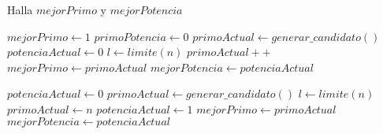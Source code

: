 \begin{algorithm}
\caption{Halla $mejorPrimo$ y $mejorPotencia$}
\begin{algorithmic}[1]
\STATE $mejorPrimo \leftarrow 1$
\STATE $primoPotencia \leftarrow 0$
\STATE $primoActual \leftarrow generar\_candidato()$
\STATE $potenciaActual \leftarrow 0$
\STATE $l \leftarrow limite(n)$
        \STATE $primoActual++$
    \ELSE
            \STATE $mejorPrimo \leftarrow primoActual$
            \STATE $mejorPotencia \leftarrow potenciaActual$
        \ENDIF

        \STATE $potenciaActual \leftarrow 0$
        \STATE $primoActual \leftarrow generar\_candidato()$
        \STATE $l \leftarrow limite(n)$
    \ENDIF
\ENDWHILE
{}
    \STATE $primoActual \leftarrow n$
    \STATE $potenciaActual \leftarrow 1$
\ENDIF
{}
    \STATE $mejorPrimo \leftarrow primoActual$
    \STATE $mejorPotencia \leftarrow potenciaActual$
\ENDIF
\end{algorithmic}
\end{algorithm}

